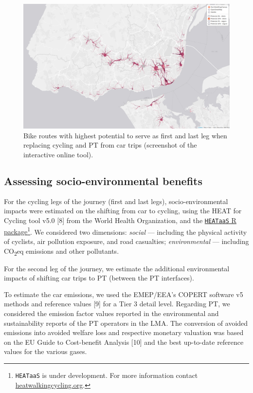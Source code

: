 \documentclass[runningheads]{llncs}
\begin{document}
\begin{figure}[h]

{\centering \includegraphics[width=0.8\linewidth,]{img/map2} 

}

\caption{Bike routes with highest potential to serve as first and last leg when replacing cycling and PT from car trips (screenshot of the interactive online tool).}\label{fig:map2}
\end{figure}

\subsection{Assessing socio-environmental
benefits}\label{assessing-socio-environmental-benefits}

For the cycling legs of the journey (first and last legs),
socio-environmental impacts were estimated on the shifting from car to
cycling, using the HEAT for Cycling tool v5.0 {[}8{]} from the World
Health Organization, and the
\href{https://github.com/HEAT-WHO/HEAT_heatr_api}{\texttt{HEATaaS} R
package}\footnote{\texttt{HEATaaS} is under development. For more
  information contact
  \href{https://heatwalkingcycling.org}{heatwalkingcycling.org}.}. We
considered two dimensions: \emph{social} --- including the physical
activity of cyclists, air pollution exposure, and road casualties;
\emph{environmental} --- including CO\textsubscript{2}eq emissions and
other pollutants.

For the second leg of the journey, we estimate the additional
environmental impacts of shifting car trips to PT (between the PT
interfaces).

To estimate the car emissions, we used the EMEP/EEA's COPERT software v5
methods and reference values {[}9{]} for a Tier 3 detail level.
Regarding PT, we considered the emission factor values reported in the
environmental and sustainability reports of the PT operators in the LMA.
The conversion of avoided emissions into avoided welfare loss and
respective monetary valuation was based on the EU Guide to Cost-benefit
Analysis {[}10{]} and the best up-to-date reference values for the
various gases.
\end{document}
